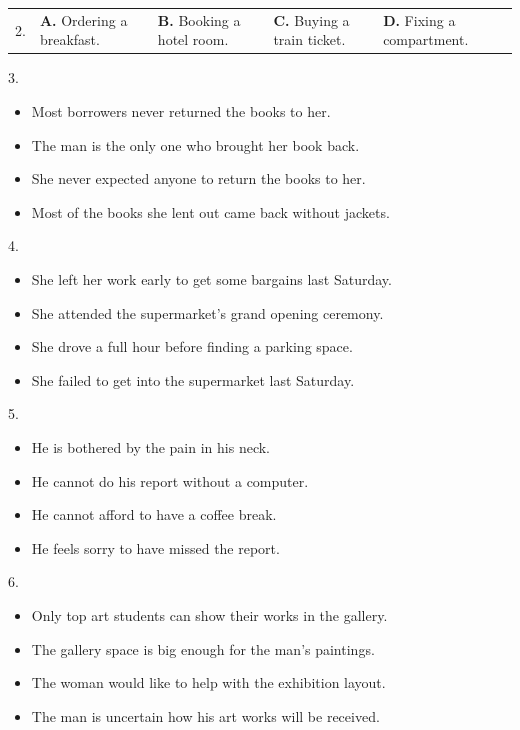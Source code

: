 \documentclass[UTF8,11pt]{ctexart}
\begin{document}
\noindent\begin{tabularx}{\linewidth}{@{}lXXXX@{}}2. & \textbf{A.} Ordering a breakfast. & \textbf{B.} Booking a hotel room. & \textbf{C.} Buying a train ticket. & \textbf{D.} Fixing a compartment.\\\end{tabularx}\par

3.


\begin{itemize}[leftmargin=2em,itemsep=.2em,topsep=.4em]\item[A.] Most borrowers never returned the books to her.
\item[B.] The man is the only one who brought her book back.
\item[C.] She never expected anyone to return the books to her.
\item[D.] Most of the books she lent out came back without jackets.
\end{itemize}

4.


\begin{itemize}[leftmargin=2em,itemsep=.2em,topsep=.4em]\item[A.] She left her work early to get some bargains last Saturday.
\item[B.] She attended the supermarket’s grand opening ceremony.
\item[C.] She drove a full hour before finding a parking space.
\item[D.] She failed to get into the supermarket last Saturday.
\end{itemize}

5.


\begin{itemize}[leftmargin=2em,itemsep=.2em,topsep=.4em]\item[A.] He is bothered by the pain in his neck.
\item[B.] He cannot do his report without a computer.
\item[C.] He cannot afford to have a coffee break.
\item[D.] He feels sorry to have missed the report.
\end{itemize}

6.


\begin{itemize}[leftmargin=2em,itemsep=.2em,topsep=.4em]\item[A.] Only top art students can show their works in the gallery.
\item[B.] The gallery space is big enough for the man’s paintings.
\item[C.] The woman would like to help with the exhibition layout.
\item[D.] The man is uncertain how his art works will be received.
\end{itemize}
\end{document}
